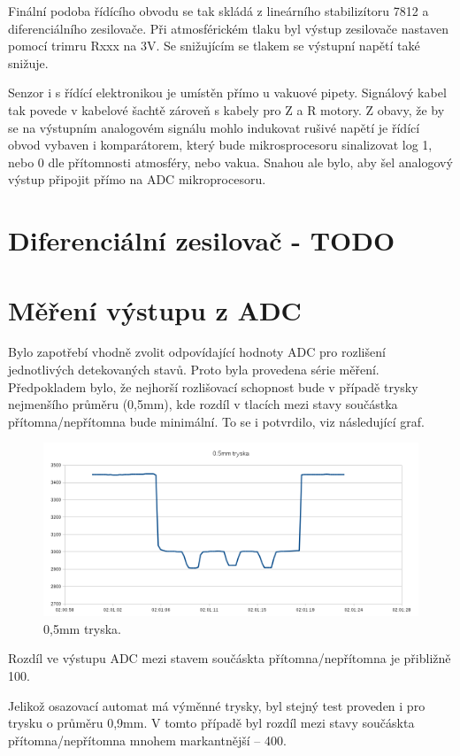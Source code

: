 Finální podoba  řídícího obvodu se tak skládá z lineárního stabilizítoru 7812 a diferenciálního zesilovače. Při atmosférickém tlaku byl výstup zesilovače nastaven pomocí trimru Rxxx na 3V. Se snižujícím se tlakem se výstupní napětí také snižuje.

 Senzor i s řídící elektronikou je umístěn přímo u vakuové pipety. Signálový kabel tak povede v kabelové šachtě zároveň s kabely pro Z a R motory. Z obavy, že by se na výstupním analogovém signálu mohlo indukovat rušivé napětí je řídící obvod vybaven i komparátorem, který bude mikrosprocesoru sinalizovat log 1, nebo 0 dle přítomnosti atmosféry, nebo vakua. Snahou ale bylo, aby šel analogový výstup připojit přímo na ADC mikroprocesoru.


\section{Diferenciální zesilovač - TODO}

\section{Měření výstupu z ADC}
Bylo zapotřebí vhodně zvolit odpovídající hodnoty ADC pro rozlišení jednotlivých detekovaných stavů. Proto byla provedena série měření. Předpokladem bylo, že nejhorší rozlišovací schopnost bude v případě trysky nejmenšího průměru (0,5mm), kde rozdíl v tlacích mezi stavy součástka přítomna/nepřítomna bude minimální. To se i potvrdilo, viz následující graf.

\begin{figure}[h!]
  \centering
    \includegraphics[width=0.9\linewidth]{obrazky/05mm_graf.png}%
    \caption{0,5mm tryska.}
    \label{fig:sensor}
\end{figure}

Rozdíl ve výstupu ADC mezi stavem součáskta přítomna/nepřítomna je přibližně 100.

Jelikož osazovací automat má výměnné trysky, byl stejný test proveden i pro trysku o průměru 0,9mm. V tomto případě byl rozdíl mezi stavy součáskta přítomna/nepřítomna mnohem markantnější – 400.

